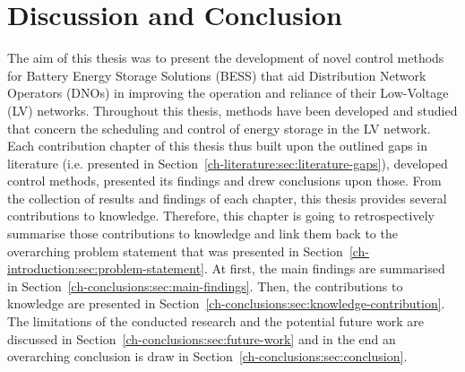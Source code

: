\chapter{Discussion and Conclusion}
\label{ch-conclusions}

The aim of this thesis was to present the development of novel control methods for Battery Energy Storage Solutions (BESS) that aid Distribution Network Operators (DNOs) in improving the operation and reliance of their Low-Voltage (LV) networks.
Throughout this thesis, methods have been developed and studied that concern the scheduling and control of energy storage in the LV network.
Each contribution chapter of this thesis thus built upon the outlined gaps in literature (i.e. presented in Section~\ref{ch-literature:sec:literature-gaps}), developed control methods, presented its findings and drew conclusions upon those.
From the collection of results and findings of each chapter, this thesis provides several contributions to knowledge.
Therefore, this chapter is going to retrospectively summarise those contributions to knowledge and link them back to the overarching problem statement that was presented in Section~\ref{ch-introduction:sec:problem-statement}.
At first, the main findings are summarised in Section~\ref{ch-conclusions:sec:main-findings}.
Then, the contributions to knowledge are presented in Section~\ref{ch-conclusions:sec:knowledge-contribution}.
The limitations of the conducted research and the potential future work are discussed in Section~\ref{ch-conclusions:sec:future-work} and in the end an overarching conclusion is draw in Section~\ref{ch-conclusions:sec:conclusion}.











